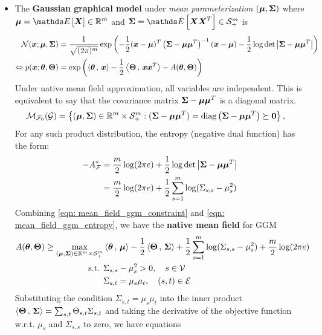 \documentclass[11pt]{article}
\begin{document}
\begin{itemize}
\item The \textbf{Gaussian graphical model} under \emph{mean parameterization} $(\boldsymbol{\mu}, \boldsymbol{\Sigma})$ where $\mb{\mu} = \E{}{\mb{X}} \in \bR^{m}$ and $\mb{\Sigma} = \E{}{\mb{X}\mb{X}^{T}} \in \cS_{+}^{m}$ is 
\begin{align}
{\mathcal N}(\boldsymbol{x}; \boldsymbol{\mu}, \boldsymbol{\Sigma}) &=\frac{1}{\sqrt{(2\pi)^{m} }} \exp\left(-\frac{1}{2}(\boldsymbol{x} - \boldsymbol{\mu})^{T}\left(\boldsymbol{\Sigma}  - \boldsymbol{\mu}\boldsymbol{\mu}^{T}\right)^{-1}(\boldsymbol{x} - \boldsymbol{\mu}) - \frac{1}{2}\log \det\left\lvert \boldsymbol{\Sigma}  - \boldsymbol{\mu}\boldsymbol{\mu}^{T} \right\rvert\right) \label{eqn: ggm_mean} \\
\Leftrightarrow p(\boldsymbol{x}; \boldsymbol{\theta}, \boldsymbol{\Theta}) &= \exp\left(\left\langle \boldsymbol{\theta}\,,\, \boldsymbol{x} \right\rangle - \frac{1}{2}\left\langle \boldsymbol{\Theta}\,,\, \boldsymbol{x}\boldsymbol{x}^{T} \right\rangle - A(\boldsymbol{\theta}, \boldsymbol{\Theta})\right) \label{eqn: ggm_exp}
\end{align} Under native mean field approximation, all variables are independent. This is equivalent to say that the covariance matrix $\boldsymbol{\Sigma}  - \boldsymbol{\mu}\boldsymbol{\mu}^{T}$ is a diagonal matrix.
\begin{align}
{\mathcal M}_{{\mathcal F}_{0}}({\mathcal G}) &= \left\{(\boldsymbol{\mu}, \boldsymbol{\Sigma})  \in {\mathbb R}^{m} \times {\mathcal S}_{+}^{m}:  (\boldsymbol{\Sigma}  - \boldsymbol{\mu}\boldsymbol{\mu}^{T}) = \text{diag}\left(\boldsymbol{\Sigma}  - \boldsymbol{\mu}\boldsymbol{\mu}^{T}\right) \succeq \boldsymbol{0} \right\},  \label{eqn: mean_field_ggm_constraint}
\end{align} For any such product distribution, the entropy (negative dual function) has the form:
\begin{align}
-A_{{\mathcal F}}^{*} &= \frac{m}{2}\log(2\pi e) + \frac{1}{2}\log \det\left\lvert \boldsymbol{\Sigma}  - \boldsymbol{\mu}\boldsymbol{\mu}^{T} \right\rvert \nonumber\\
&=\frac{m}{2}\log(2\pi e) + \frac{1}{2}\sum_{s=1}^{m}\log(\Sigma_{s,s}  - \mu_{s}^2)   \label{eqn: mean_field_ggm_entropy}
\end{align} Combining \eqref{eqn: mean_field_ggm_constraint} and \eqref{eqn: mean_field_ggm_entropy}, we have the \textbf{native mean field} for GGM
\begin{align}
A(\boldsymbol{\theta}, \boldsymbol{\Theta}) \ge \max_{(\boldsymbol{\mu}, \boldsymbol{\Sigma})  \in {\mathbb R}^{m} \times {\mathcal S}_{+}^{m}} &\left\langle \boldsymbol{\theta}\,,\, \boldsymbol{\mu} \right\rangle -\frac{1}{2} \left\langle \boldsymbol{\Theta}\,,\, \boldsymbol{\Sigma} \right\rangle + \frac{1}{2}\sum_{s=1}^{m}\log(\Sigma_{s,s}  - \mu_{s}^2) + \frac{m}{2}\log(2\pi e) \label{eqn: mean_field_ggm}\\
\text{s.t. }& \Sigma_{s,s}  - \mu_{s}^2 >0, \quad s \in {\mathcal V} \nonumber\\
&\Sigma_{s,t} = \mu_{s}\mu_{t}, \quad (s,t) \in {\mathcal E}  \nonumber
\end{align}  Substituting the condition $\Sigma_{s,t} = \mu_{s}\mu_{t}$ into the inner product $\left\langle \boldsymbol{\Theta}\,,\, \boldsymbol{\Sigma} \right\rangle = \sum_{s,t}\Theta_{s,t}\Sigma_{s,t}$ and taking the derivative of the objective function w.r.t. $\mu_s$ and $\Sigma_{s,s}$ to zero, we have equations

\end{itemize}
\end{document}
